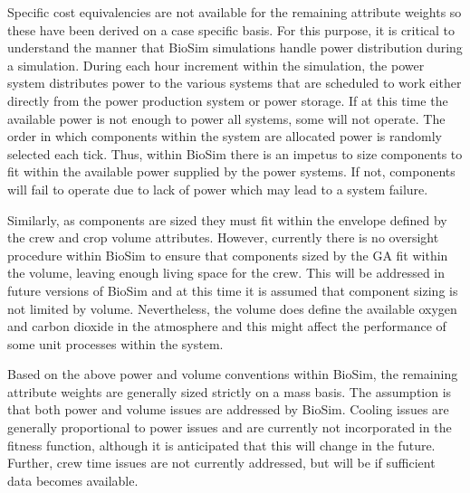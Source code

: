 \documentclass[submit]{aiaa}
\begin{document}
Specific cost equivalencies are not available for the remaining
attribute weights so these have been derived on a case specific
basis. For this purpose, it is critical to understand the manner that
BioSim simulations handle power distribution during a
simulation. During each hour increment within the simulation, the
power system distributes power to the various systems that are
scheduled to work either directly from the power production system or
power storage. If at this time the available power is not enough to
power all systems, some will not operate. 
The order in which components within the system are allocated power is randomly selected each tick.
Thus, within BioSim there is an impetus to size components to fit within the available power supplied by the power systems. 
If not, components will fail to operate due to lack of power which may lead to a system failure.

Similarly, as components are sized they must fit within the envelope
defined by the crew and crop volume attributes.  However, currently there is
no oversight procedure within BioSim to ensure that components sized
by the GA fit within the volume, leaving enough living space for the
crew. This will be addressed in future versions of BioSim and at this
time it is assumed that component sizing is not limited by volume.
Nevertheless, the volume does define the available oxygen and carbon dioxide in the atmosphere and this might affect the performance of some unit processes within the system.

Based on the above power and volume conventions within BioSim, the 
remaining attribute weights are generally sized strictly on a mass
basis. The assumption is that both power and volume issues are
addressed by BioSim.  Cooling issues are generally proportional to
power issues and are currently not incorporated in the fitness
function, although it is anticipated that this will change in the
future. Further, crew time issues are not currently addressed, but will be if
sufficient data becomes available. 
\end{document}
